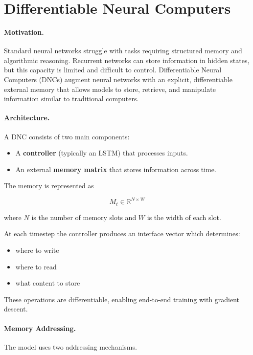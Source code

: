 \documentclass[12pt]{article}
\begin{document}
\psetheader

\section*{Differentiable Neural Computers}

\paragraph{Motivation.}
Standard neural networks struggle with tasks requiring structured memory and algorithmic reasoning.
Recurrent networks can store information in hidden states, but this capacity is limited and difficult
to control. Differentiable Neural Computers (DNCs) augment neural networks with an explicit,
differentiable external memory that allows models to store, retrieve, and manipulate information
similar to traditional computers.

\paragraph{Architecture.}
A DNC consists of two main components:

\begin{itemize}
		\item A \textbf{controller} (typically an LSTM) that processes inputs.
		\item An external \textbf{memory matrix} that stores information across time.
\end{itemize}

The memory is represented as

\[
		M_t \in \mathbb{R}^{N \times W}
\]

where $N$ is the number of memory slots and $W$ is the width of each slot.

At each timestep the controller produces an interface vector which determines:

\begin{itemize}
		\item where to write
		\item where to read
		\item what content to store
\end{itemize}

These operations are differentiable, enabling end-to-end training with gradient descent.

\paragraph{Memory Addressing.}
The model uses two addressing mechanisms.
\end{document}

